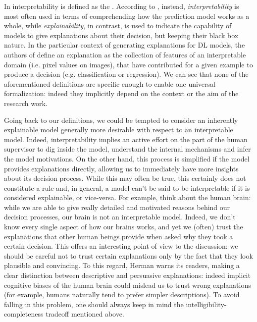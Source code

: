 In \cite{doshivelez2017rigorous} interpretability is defined as the . According to \cite{burkart2021survey}, instead, \textit{interpretability} is most often used in terms of comprehending how the prediction model works as a whole, while \textit{explainability}, in contrast, is used to indicate the capability of models to give explanations about their decision, but keeping their black box nature. In the particular context of generating explanations for DL models, the authors of \cite{montavon2018methods} define an explanation as the collection of features of an interpretable domain (i.e. pixel values on images), that have contributed for a given example to produce a decision (e.g. classification or regression). We can see that none of the aforementioned definitions are specific enough to enable one universal formalization: indeed they implicitly  depend on the context or the aim of the research work. 

Going back to our definitions, we could be tempted to consider an inherently explainable model generally more desirable with respect to an interpretable model. Indeed, interpretability implies an active effort on the part of the human supervisor to dig inside the model, understand the internal mechanisms and infer the model motivations. On the other hand, this process is simplified if the model provides explanations directly, allowing us to immediately have more insights about its decision process. While this may often be true, this certainly does not constitute a rule and, in general, a model can't be said to be interpretable if it is considered explainable, or vice-versa. For example, think about the human brain:
while we are able to give really detailed and motivated reasons behind our decision processes, our brain is not an interpretable model. Indeed, we don't know every single aspect of how our brains works, and yet we (often) trust the explanations that other human beings provide when asked why they took a certain decision. This offers an interesting point of view to the discussion: we should be careful not to trust certain explanations only by the fact that they look plausible and convincing. To this regard, Herman \cite{Herman2017ThePA} warns its readers, making a clear distinction between descriptive and persuasive explanations: indeed implicit cognitive biases of the human brain could mislead us to trust wrong explanations (for example, humans naturally tend to prefer simpler descriptions). To avoid falling in this problem, one should always keep in mind the intelligibility-completeness tradeoff mentioned above.

